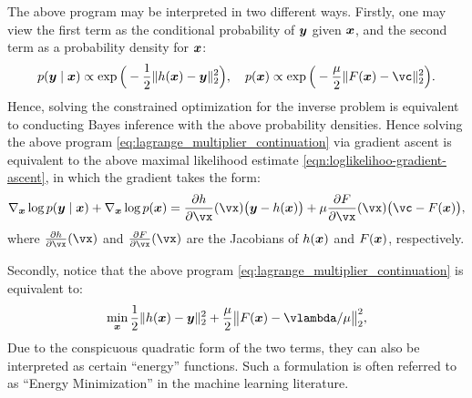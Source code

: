 \documentclass[../../book-main.tex]{subfiles}
\begin{document}
The above program may be interpreted in two different ways. Firstly, one may view the first term as the conditional probability of $\bm{y}$ given $\bm{x}$, and the second term as a probability density for $\bm{x}$:
\begin{equation}
  p(\y\mid \x) \propto \exp\Big(- \frac{1}{2}\|h(\x) - \y\|_2^2\Big), \quad 
    p(\x) \propto \exp\Big( - \frac{\mu}{2}\|F(\x) - \vc\|_2^2\Big).
\end{equation} 
Hence, solving the constrained optimization for the inverse problem is equivalent to conducting Bayes inference with the above probability densities. Hence solving the above program \eqref{eq:lagrange_multiplier_continuation} via gradient ascent is equivalent to the above maximal likelihood estimate \eqref{eqn:loglikelihoo-gradient-ascent}, 
in which the gradient  takes the form:
\begin{equation}
   \nabla_{\x} \log p(\y \mid \x) + \nabla_{\x} \log p(\x)   =  \pdv{h}{\vx}(\vx)\big(\y - h(\x)\big) + \mu \pdv{F}{\vx}(\vx)\big(\vc - F(\x)\big),
\end{equation}
where $\pdv{h}{\vx}(\vx)$ and $\pdv{F}{\vx}(\vx)$ are the Jacobians of $h(\bm{x})$ and $F(\bm{x})$, respectively.

Secondly, notice that the above program \eqref{eq:lagrange_multiplier_continuation} is equivalent to:
\begin{equation}
\min_{\x} \frac{1}{2}\|h(\x) - \y\|_2^2 + \frac{\mu}{2} \big\|F(\x) - \vlambda/\mu\big\|_2^2,
\label{eqn:energy-minimization}
\end{equation} 
Due to the conspicuous quadratic form of the two terms, they can also be interpreted as certain ``energy'' functions. Such a formulation is often referred to as ``Energy Minimization'' in the machine learning literature.  

\end{document}
